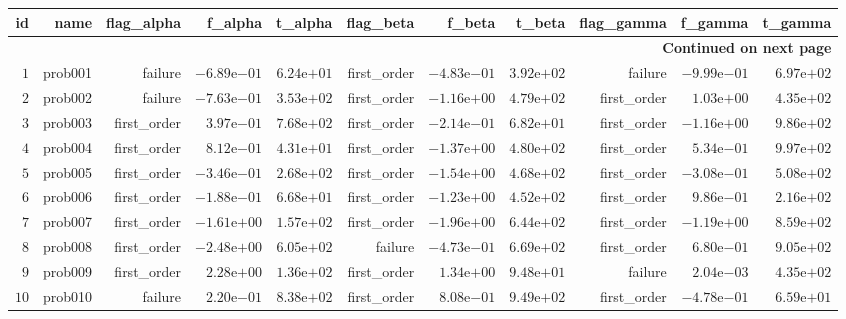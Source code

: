 \begin{longtable}{rrrrrrrrrrr}
\hline
id & name & flag\_alpha & f\_alpha & t\_alpha & flag\_beta & f\_beta & t\_beta & flag\_gamma & f\_gamma & t\_gamma \\\hline
\endhead
\hline
\multicolumn{11}{r}{{\bfseries Continued on next page}}\\
\hline
\endfoot
\endlastfoot
\(     1\) & prob001 & failure & \(-6.89\)e\(-01\) & \( 6.24\)e\(+01\) & first\_order & \(-4.83\)e\(-01\) & \( 3.92\)e\(+02\) & failure & \(-9.99\)e\(-01\) & \( 6.97\)e\(+02\) \\
\(     2\) & prob002 & failure & \(-7.63\)e\(-01\) & \( 3.53\)e\(+02\) & first\_order & \(-1.16\)e\(+00\) & \( 4.79\)e\(+02\) & first\_order & \( 1.03\)e\(+00\) & \( 4.35\)e\(+02\) \\
\(     3\) & prob003 & first\_order & \( 3.97\)e\(-01\) & \( 7.68\)e\(+02\) & first\_order & \(-2.14\)e\(-01\) & \( 6.82\)e\(+01\) & first\_order & \(-1.16\)e\(+00\) & \( 9.86\)e\(+02\) \\
\(     4\) & prob004 & first\_order & \( 8.12\)e\(-01\) & \( 4.31\)e\(+01\) & first\_order & \(-1.37\)e\(+00\) & \( 4.80\)e\(+02\) & first\_order & \( 5.34\)e\(-01\) & \( 9.97\)e\(+02\) \\
\(     5\) & prob005 & first\_order & \(-3.46\)e\(-01\) & \( 2.68\)e\(+02\) & first\_order & \(-1.54\)e\(+00\) & \( 4.68\)e\(+02\) & first\_order & \(-3.08\)e\(-01\) & \( 5.08\)e\(+02\) \\
\(     6\) & prob006 & first\_order & \(-1.88\)e\(-01\) & \( 6.68\)e\(+01\) & first\_order & \(-1.23\)e\(+00\) & \( 4.52\)e\(+02\) & first\_order & \( 9.86\)e\(-01\) & \( 2.16\)e\(+02\) \\
\(     7\) & prob007 & first\_order & \(-1.61\)e\(+00\) & \( 1.57\)e\(+02\) & first\_order & \(-1.96\)e\(+00\) & \( 6.44\)e\(+02\) & first\_order & \(-1.19\)e\(+00\) & \( 8.59\)e\(+02\) \\
\(     8\) & prob008 & first\_order & \(-2.48\)e\(+00\) & \( 6.05\)e\(+02\) & failure & \(-4.73\)e\(-01\) & \( 6.69\)e\(+02\) & first\_order & \( 6.80\)e\(-01\) & \( 9.05\)e\(+02\) \\
\(     9\) & prob009 & first\_order & \( 2.28\)e\(+00\) & \( 1.36\)e\(+02\) & first\_order & \( 1.34\)e\(+00\) & \( 9.48\)e\(+01\) & failure & \( 2.04\)e\(-03\) & \( 4.35\)e\(+02\) \\
\(    10\) & prob010 & failure & \( 2.20\)e\(-01\) & \( 8.38\)e\(+02\) & first\_order & \( 8.08\)e\(-01\) & \( 9.49\)e\(+02\) & first\_order & \(-4.78\)e\(-01\) & \( 6.59\)e\(+01\) \\\hline
\end{longtable}
